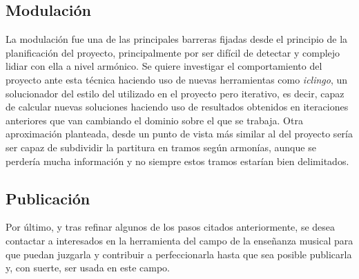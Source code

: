 \subsection{Modulación}
La modulación fue una de las principales barreras fijadas desde el principio de la planificación del proyecto, principalmente por ser difícil de detectar y complejo lidiar con ella a nivel armónico. Se quiere investigar el comportamiento del proyecto ante esta técnica haciendo uso de nuevas herramientas como \textit{iclingo}, un solucionador del estilo del utilizado en el proyecto pero iterativo, es decir, capaz de calcular nuevas soluciones haciendo uso de resultados obtenidos en iteraciones anteriores que van cambiando el dominio sobre el que se trabaja.
Otra aproximación planteada, desde un punto de vista más similar al del proyecto sería ser capaz de subdividir la partitura en tramos según armonías, aunque se perdería mucha información y no siempre estos tramos estarían bien delimitados.

\subsection{Publicación}
Por último, y tras refinar algunos de los pasos citados anteriormente, se desea contactar a interesados en la herramienta del campo de la enseñanza musical para que puedan juzgarla y contribuir a perfeccionarla hasta que sea posible publicarla y, con suerte, ser usada en este campo.